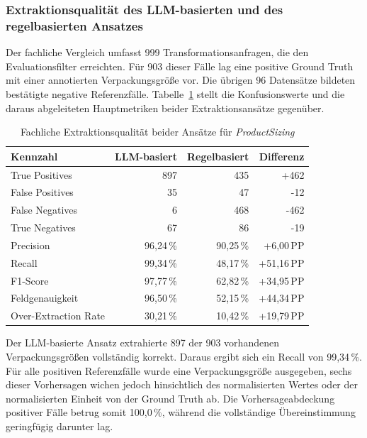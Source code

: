 \subsubsection{Extraktionsqualität des LLM-basierten und des regelbasierten Ansatzes}

Der fachliche Vergleich umfasst 999 Transformationsanfragen, die den Evaluationsfilter erreichten. Für 903 dieser Fälle lag eine positive Ground Truth mit einer annotierten Verpackungsgröße vor. Die übrigen 96 Datensätze bildeten bestätigte negative Referenzfälle. Tabelle~\ref{tab:extraktionsqualitaet-vergleich} stellt die Konfusionswerte und die daraus abgeleiteten Hauptmetriken beider Extraktionsansätze gegenüber.

\begin{table}[htbp]
    \centering
    \small
    \begin{tabular}{p{} r r r}
        \hline
        \textbf{Kennzahl} &
        \textbf{LLM-basiert} &
        \textbf{Regelbasiert} &
        \textbf{Differenz} \\
        \hline
        True Positives & 897 & 435 & +462 \\
        False Positives & 35 & 47 & -12 \\
        False Negatives & 6 & 468 & -462 \\
        True Negatives & 67 & 86 & -19 \\
        Precision & 96,24\,\% & 90,25\,\% & +6,00\,PP \\
        Recall & 99,34\,\% & 48,17\,\% & +51,16\,PP \\
        F1-Score & 97,77\,\% & 62,82\,\% & +34,95\,PP \\
        Feldgenauigkeit & 96,50\,\% & 52,15\,\% & +44,34\,PP \\
        Over-Extraction Rate & 30,21\,\% & 10,42\,\% & +19,79\,PP \\
        \hline
    \end{tabular}
    \caption{Fachliche Extraktionsqualität beider Ansätze für \textit{ProductSizing}}
    \label{tab:extraktionsqualitaet-vergleich}
\end{table}

Der LLM-basierte Ansatz extrahierte 897 der 903 vorhandenen Verpackungsgrößen vollständig korrekt. Daraus ergibt sich ein Recall von 99,34\,\%. Für alle positiven Referenzfälle wurde eine Verpackungsgröße ausgegeben, sechs dieser Vorhersagen wichen jedoch hinsichtlich des normalisierten Wertes oder der normalisierten Einheit von der Ground Truth ab. Die Vorhersageabdeckung positiver Fälle betrug somit 100,0\,\%, während die vollständige Übereinstimmung geringfügig darunter lag.

